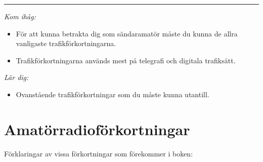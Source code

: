 \vspace{1em} \hrule \vspace{1em}

\noindent\emph{Kom ihåg:}\\

\begin{itemize}
\item För att kunna betrakta dig som sändaramatör måste du kunna de allra
vanligaste trafikförkortningarna.

\item Trafikförkortningarna används mest på telegrafi och digitala
trafiksätt.\\
\end{itemize}

\noindent\emph{Lär dig:}\\

\begin{itemize}
\item Ovanstående trafikförkortningar som du måste kunna utantill.
\end{itemize}

\section{Amatörradioförkortningar}

Förklaringar av vissa förkortningar som förekommer i boken:

